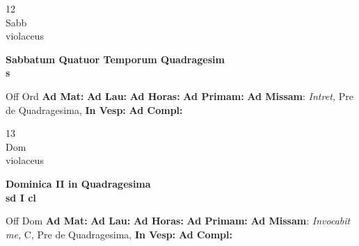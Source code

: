 \documentclass[10pt, openany]{book}
\begin{document}
        \begin{center}
            \begin{minipage}{3.5in}
                \vspace{2em}
                \begin{minipage}{0.5in}
                    {\Huge 12} \\
                    {\normalsize Sabb} \\
                    {\normalsize violaceus}
                \end{minipage}
                \begin{minipage}{3.0in}
                    \textbf{ \large Sabbatum Quatuor Temporum Quadragesim \\
                    \textnormal{\normalsize s}} \\ 
                \end{minipage}
                \begin{justify}Off Ord
                    \textbf{Ad Mat: }
                    \textbf{Ad Lau: }
                    \textbf{Ad Horas: }
                    \textbf{Ad Primam: }\textbf{Ad Missam}: \textit{Intret,} Pre de Quadragesima,  
                    \textbf{In Vesp: }
                    \textbf{Ad Compl: }
                \end{justify}
            \end{minipage}
        \end{center}
    
        \begin{center}
            \begin{minipage}{3.5in}
                \vspace{2em}
                \begin{minipage}{0.5in}
                    {\Huge 13} \\
                    {\normalsize Dom} \\
                    {\normalsize violaceus}
                \end{minipage}
                \begin{minipage}{3.0in}
                    \textbf{ \large Dominica II in Quadragesima \\
                    \textnormal{\normalsize sd I cl}} \\ 
                \end{minipage}
                \begin{justify}Off Dom
                    \textbf{Ad Mat: }
                    \textbf{Ad Lau: }
                    \textbf{Ad Horas: }
                    \textbf{Ad Primam: }\textbf{Ad Missam}: \textit{Invocabit me,} C, Pre de Quadragesima,  
                    \textbf{In Vesp: }
                    \textbf{Ad Compl: }
                \end{justify}
            \end{minipage}
        \end{center}
    
\end{document}
